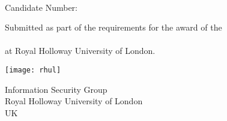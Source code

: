\makeatletter
\begin{titlepage}
    \begin{center}
        \vspace*{1cm}
        
        \Huge
        \textbf{\@title}
        
        \vspace{1.5cm}
        
        \textbf{\@author}\\
        \huge
        Candidate Number: \@CandidateNo
        
        \vfill
        \Large
        Submitted as part of the requirements for the award of the \\
        \@degree \\
        at Royal Holloway University of London.
        
        \vspace{2cm}
        
        \texttt{[image: rhul]}
        
        \vspace{2cm}

        \Large
        Information Security Group\\
        Royal Holloway University of London\\
        UK\\
        \@date
        
    \end{center}
\end{titlepage}
\makeatother